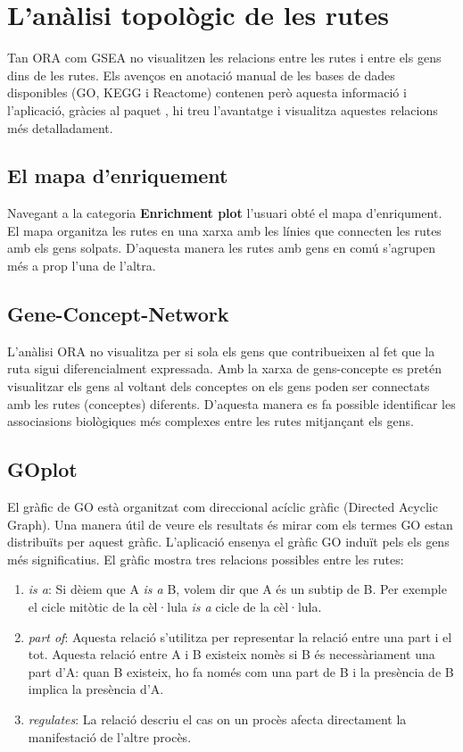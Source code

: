 \section{L'anàlisi topològic de les rutes}
Tan ORA com GSEA no visualitzen les relacions entre les rutes i entre els gens dins de les rutes. Els avenços en anotació manual de les bases de dades disponibles (GO, KEGG i Reactome) contenen però aquesta informació i l'aplicació, gràcies al paquet , hi treu l'avantatge i visualitza aquestes relacions més detalladament. 

\subsection{El mapa d'enriquement}

Navegant a la categoria \textbf{Enrichment plot} l'usuari obté el mapa d'enriqument. El mapa organitza les rutes en una xarxa amb les línies que connecten les rutes amb els gens solpats. D'aquesta manera les rutes amb gens en comú s'agrupen més a prop l'una de l'altra.

\subsection{Gene-Concept-Network}

L'anàlisi ORA no visualitza per si sola els gens que contribueixen al fet que la ruta sigui diferencialment expressada. Amb la xarxa de gens-concepte es pretén visualitzar els gens al voltant dels conceptes on els gens poden ser connectats amb les rutes (conceptes) diferents. D'aquesta manera es fa possible identificar les associasions biològiques més complexes entre les rutes mitjançant els gens. 

\subsection{GOplot}

El gràfic de GO està organitzat com direccional acíclic gràfic (Directed Acyclic Graph). Una manera útil de veure els resultats és mirar com els termes GO estan distribuïts per aquest gràfic. L'aplicació ensenya el gràfic GO induït pels els gens més significatius. El gràfic mostra tres relacions possibles entre les rutes: 
\begin{enumerate}
\item \textit{is a}: Si dèiem que A \textit{is a} B, volem dir que A és un subtip de B. Per exemple el cicle mitòtic de la cèl·lula \textit{is a} cicle de la cèl·lula. 
\item \textit{part of}: Aquesta relació s'utilitza per representar la relació entre una part i el tot. Aquesta relació entre A i B existeix nomès si B és necessàriament una part d'A: quan B existeix, ho fa només com una part de B i la presència de B implica la presència d’A.
\item \textit{regulates}: La relació descriu el cas on un procès afecta directament la manifestació de l'altre procès.
\end{enumerate}

